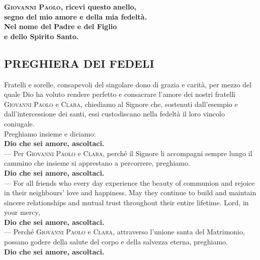 \documentclass[10pt,b6paper,usenames,twoside]{article}
\begin{document}
\begin{large} 
\noindent \textbf{\textcolor{forestgreen(traditional)}{\textsc{Giovanni Paolo}}, ricevi questo anello,\\ 
segno del mio amore e della mia fedeltà.\\ 
Nel nome del Padre e del Figlio\\ 
e dello Spirito Santo.} 
\end{large} 

\subsection*{\textcolor{forestgreen(traditional)}{PREGHIERA DEI FEDELI}} 
\noindent Fratelli e sorelle, consapevoli del singolare dono di grazia e carità, per mezzo del quale Dio ha voluto rendere perfetto e consacrare l'amore dei nostri fratelli \textcolor{forestgreen(traditional)}{\textsc{Giovanni Paolo}} e \textcolor{forestgreen(traditional)}{\textsc{Clara}}, chiediamo al Signore che, sostenuti dall'esempio e dall'intercessione dei santi, essi custodiscano nella fedeltà il loro vincolo coniugale.\\ 

\noindent Preghiamo insieme e diciamo:\\ 
\textbf{Dio che sei amore, ascoltaci.}\\


\noindent --- Per \textcolor{forestgreen(traditional)}{\textsc{Giovanni Paolo}} e \textcolor{forestgreen(traditional)}{\textsc{Clara}}, perché il Signore li accompagni sempre lungo il cammino che insieme si apprestano a percorrere, preghiamo.\\ 
\textbf{Dio che sei amore, ascoltaci.}\\ 

\noindent --- For all friends who every day experience the beauty of communion and rejoice in their neighbours' love and happiness. May they continue to build and maintain sincere relationships and mutual trust throughout their entire lifetime. Lord, in your mercy,\\ 
\textbf{Dio che sei amore, ascoltaci.}\\ 

\noindent --- Perché \textcolor{forestgreen(traditional)}{\textsc{Giovanni Paolo}} e \textcolor{forestgreen(traditional)}{\textsc{Clara}}, attraverso l’unione santa del Matrimonio, possano godere della salute del corpo e della salvezza eterna, preghiamo.\\ 
\textbf{Dio che sei amore, ascoltaci.}\\ 
\end{document}
